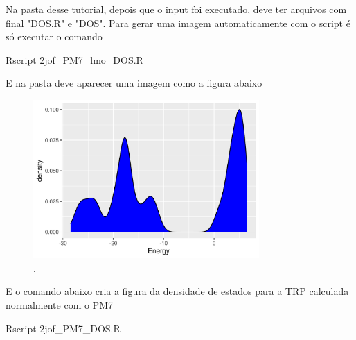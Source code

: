 \documentclass[a4paper,11pt]{refart}
\begin{document}
Na pasta desse tutorial, depois que o input foi executado, deve ter arquivos com final "DOS.R" e "DOS". Para gerar uma imagem automaticamente com o script é só executar o comando

\hspace*{-\leftmarginwidth}
\begin{minipage}{\fullwidth}
	\begin{commandshell}Rscript 2jof_PM7_lmo_DOS.R\end{commandshell}
\end{minipage}

E na pasta deve aparecer uma imagem como a figura abaixo

\hspace*{-\leftmarginwidth}
\begin{minipage}{\fullwidth}
	\begin{figure}[H]
		\begin{center}
			\includegraphics[width=3.4in]{images/tut3_img31}
			\caption{.}
			\label{fig_tut3_30}
		\end{center}
	\end{figure}
\end{minipage}

E o comando abaixo cria a figura da densidade de estados para a TRP calculada normalmente com o PM7

\hspace*{-\leftmarginwidth}
\begin{minipage}{\fullwidth}
	\begin{commandshell}Rscript 2jof_PM7_DOS.R\end{commandshell}
\end{minipage}
\end{document}
